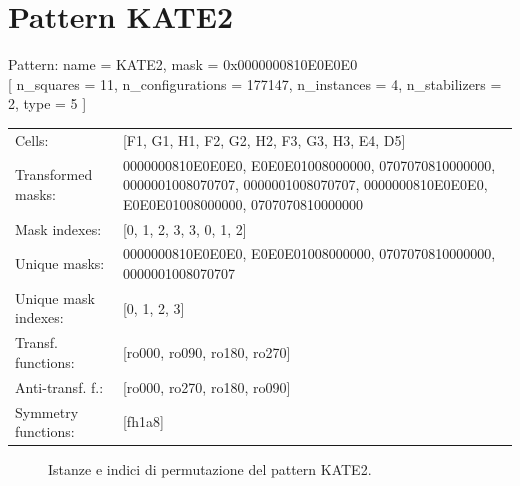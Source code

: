 \newpage

\section{Pattern KATE2}

\begin{tcolorbox}[sharp corners, fontupper=\ttfamily\small, colback=white]
  \noindent Pattern: name = KATE2, mask = 0x0000000810E0E0E0\\
  {[} n\_squares = 11, n\_configurations = 177147,
  n\_instances = 4, n\_stabilizers = 2, type = 5 { ]}\\[1.0ex]
  \begin{tabularx}{\textwidth}{@{} p{3.5cm} X @{}}
    Cells:               & {[}F1, G1, H1, F2, G2, H2, F3, G3, H3, E4, D5{]}\\[0.5ex]
    Transformed masks:   & 0000000810E0E0E0, E0E0E01008000000, 0707070810000000, 0000001008070707, 0000001008070707, 0000000810E0E0E0, E0E0E01008000000, 0707070810000000\\[0.5ex]
    Mask indexes:        & {[}0, 1, 2, 3, 3, 0, 1, 2{]}\\[0.5ex]
    Unique masks:        & 0000000810E0E0E0, E0E0E01008000000, 0707070810000000, 0000001008070707\\[0.5ex]
    Unique mask indexes: & {[}0, 1, 2, 3{]}\\[0.5ex]
    Transf. functions:   & {[}ro000, ro090, ro180, ro270{]}\\[0.5ex]
    Anti-transf. f.:     & {[}ro000, ro270, ro180, ro090{]}\\[0.5ex]
    Symmetry functions:  & {[}fh1a8{]}\\[0.5ex]
  \end{tabularx}
\end{tcolorbox}

\begin{figure}[htbp]
  \centering
   \hfill
   \hfill
   \hfill
  \vspace{0.3cm}
   \hfill
   \hfill
   \hfill
  \caption{Istanze e indici di permutazione del pattern KATE2.}
\end{figure}

